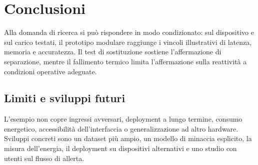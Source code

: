 \chapter{Conclusioni}
Alla domanda di ricerca si può rispondere in modo condizionato: sul dispositivo e sul carico testati, il prototipo modulare raggiunge i vincoli illustrativi di latenza, memoria e accuratezza. Il test di sostituzione sostiene l'affermazione di separazione, mentre il fallimento termico limita l'affermazione sulla reattività a condizioni operative adeguate.

\section{Limiti e sviluppi futuri}
L'esempio non copre ingressi avversari, deployment a lungo termine, consumo energetico, accessibilità dell'interfaccia o generalizzazione ad altro hardware. Sviluppi concreti sono un dataset più ampio, un modello di minaccia esplicito, la misura dell'energia, il deployment su dispositivi alternativi e uno studio con utenti sul flusso di allerta.

